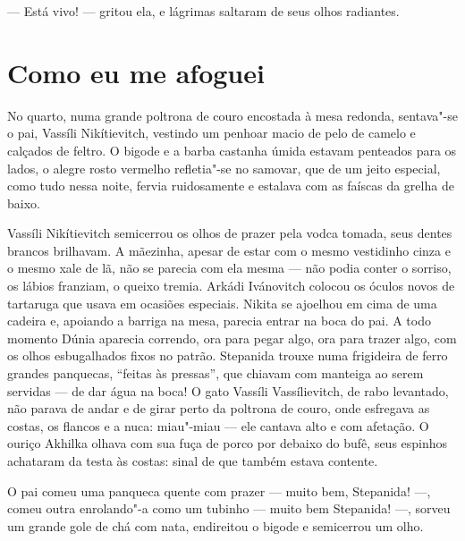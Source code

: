 --- Está vivo! --- gritou ela, e lágrimas saltaram de seus olhos
radiantes.

\chapter{Como eu me afoguei}

No quarto, numa grande poltrona de couro encostada à mesa redonda,
sentava"-se o pai, Vassíli Nikítievitch, vestindo um penhoar macio de
pelo de camelo e calçados de feltro. O bigode e a barba castanha úmida
estavam penteados para os lados, o alegre rosto vermelho refletia"-se no
samovar, que de um jeito especial, como tudo nessa noite, fervia
ruidosamente e estalava com as faíscas da grelha de baixo.

Vassíli Nikítievitch semicerrou os olhos de prazer pela vodca tomada,
seus dentes brancos brilhavam. A mãezinha, apesar de estar com o mesmo
vestidinho cinza e o mesmo xale de lã, não se parecia com ela mesma ---
não podia conter o sorriso, os lábios franziam, o queixo tremia. Arkádi
Ivánovitch colocou os óculos novos de tartaruga que usava em ocasiões
especiais. Nikita se ajoelhou em cima de uma cadeira e, apoiando a
barriga na mesa, parecia entrar na boca do pai. A todo momento Dúnia
aparecia correndo, ora para pegar algo, ora para trazer algo, com os
olhos esbugalhados fixos no patrão. Stepanida trouxe numa frigideira de
ferro grandes panquecas, ``feitas às pressas'', que chiavam com manteiga
ao serem servidas --- de dar água na boca! O gato Vassíli Vassílievitch,
de rabo levantado, não parava de andar e de girar perto da poltrona de
couro, onde esfregava as costas, os flancos e a nuca: miau"-miau --- ele
cantava alto e com afetação. O ouriço Akhilka olhava com sua fuça de
porco por debaixo do bufê, seus espinhos achataram da testa às costas:
sinal de que também estava contente.

O pai comeu uma panqueca quente com prazer --- muito bem, Stepanida!
---, comeu outra enrolando"-a como um tubinho --- muito bem Stepanida!
---, sorveu um grande gole de chá com nata, endireitou o bigode e
semicerrou um olho.

